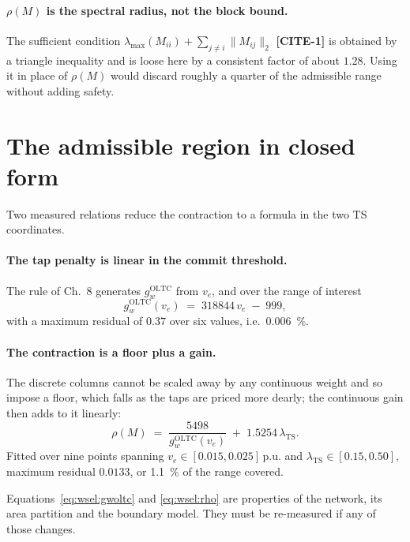 \documentclass[11pt,a4paper]{article}
\newcommand{\pu}{\ensuremath{\mathrm{p.u.}}}
\newcommand{\lamts}{\ensuremath{\lambda_{\mathrm{TS}}}}
\newcommand{\gwoltc}{\ensuremath{g_{w}^{\mathrm{OLTC}}}}
\newcommand{\CITE}[1]{\textbf{[CITE-#1]}}
\begin{document}
\paragraph{$\rho(M)$ is the spectral radius, not the block bound.}
The sufficient condition
$\lambda_{\max}(M_{ii}) + \sum_{j \neq i} \lVert M_{ij} \rVert_2$ \CITE{1} is
obtained by a triangle inequality and is loose here by a consistent factor of
about $1.28$. Using it in place of $\rho(M)$ would discard roughly a quarter of
the admissible range without adding safety.

\section{The admissible region in closed form}
\label{sec:wsel:region}

Two measured relations reduce the contraction to a formula in the two TS
coordinates.

\paragraph{The tap penalty is linear in the commit threshold.}
The rule of Ch.~8 generates \gwoltc{} from $v_e$, and over the range of interest
\begin{equation}
  \label{eq:wsel:gwoltc}
  \gwoltc(v_e) \;=\; \num{318844}\,v_e \;-\; \num{999} ,
\end{equation}
with a maximum residual of $0.37$ over six values, i.e.\ \SI{0.006}{\percent}.

\paragraph{The contraction is a floor plus a gain.}
The discrete columns cannot be scaled away by any continuous weight and so
impose a floor, which falls as the taps are priced more dearly; the continuous
gain then adds to it linearly:
\begin{equation}
  \label{eq:wsel:rho}
  \rho(M) \;=\; \frac{\num{5498}}{\gwoltc(v_e)} \;+\; 1.5254 \,\lamts .
\end{equation}
Fitted over nine points spanning $v_e \in [0.015, 0.025]\,\pu$ and
$\lamts \in [0.15, 0.50]$, maximum residual $0.0133$, or \SI{1.1}{\percent} of
the range covered.

Equations~\eqref{eq:wsel:gwoltc} and \eqref{eq:wsel:rho} are properties of the
network, its area partition and the boundary model. They must be re-measured if
any of those changes.
\end{document}
